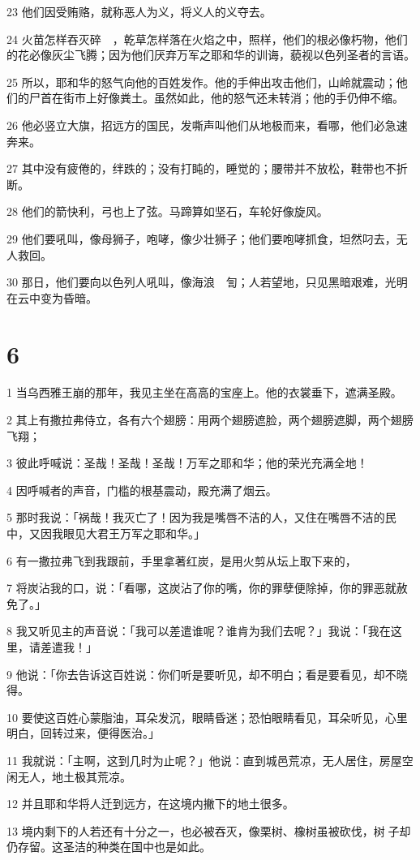 \par 23 他们因受贿赂，就称恶人为义，将义人的义夺去。
\par 24 火苗怎样吞灭碎　，乾草怎样落在火焰之中，照样，他们的根必像朽物，他们的花必像灰尘飞腾；因为他们厌弃万军之耶和华的训诲，藐视以色列圣者的言语。
\par 25 所以，耶和华的怒气向他的百姓发作。他的手伸出攻击他们，山岭就震动；他们的尸首在街市上好像粪土。虽然如此，他的怒气还未转消；他的手仍伸不缩。
\par 26 他必竖立大旗，招远方的国民，发嘶声叫他们从地极而来，看哪，他们必急速奔来。
\par 27 其中没有疲倦的，绊跌的；没有打盹的，睡觉的；腰带并不放松，鞋带也不折断。
\par 28 他们的箭快利，弓也上了弦。马蹄算如坚石，车轮好像旋风。
\par 29 他们要吼叫，像母狮子，咆哮，像少壮狮子；他们要咆哮抓食，坦然叼去，无人救回。
\par 30 那日，他们要向以色列人吼叫，像海浪　訇；人若望地，只见黑暗艰难，光明在云中变为昏暗。

\chapter{6}

\par 1 当乌西雅王崩的那年，我见主坐在高高的宝座上。他的衣裳垂下，遮满圣殿。
\par 2 其上有撒拉弗侍立，各有六个翅膀：用两个翅膀遮脸，两个翅膀遮脚，两个翅膀飞翔；
\par 3 彼此呼喊说：圣哉！圣哉！圣哉！万军之耶和华；他的荣光充满全地！
\par 4 因呼喊者的声音，门槛的根基震动，殿充满了烟云。
\par 5 那时我说：「祸哉！我灭亡了！因为我是嘴唇不洁的人，又住在嘴唇不洁的民中，又因我眼见大君王万军之耶和华。」
\par 6 有一撒拉弗飞到我跟前，手里拿著红炭，是用火剪从坛上取下来的，
\par 7 将炭沾我的口，说：「看哪，这炭沾了你的嘴，你的罪孽便除掉，你的罪恶就赦免了。」
\par 8 我又听见主的声音说：「我可以差遣谁呢？谁肯为我们去呢？」我说：「我在这里，请差遣我！」
\par 9 他说：「你去告诉这百姓说：你们听是要听见，却不明白；看是要看见，却不晓得。
\par 10 要使这百姓心蒙脂油，耳朵发沉，眼睛昏迷；恐怕眼睛看见，耳朵听见，心里明白，回转过来，便得医治。」
\par 11 我就说：「主啊，这到几时为止呢？」他说：直到城邑荒凉，无人居住，房屋空闲无人，地土极其荒凉。
\par 12 并且耶和华将人迁到远方，在这境内撇下的地土很多。
\par 13 境内剩下的人若还有十分之一，也必被吞灭，像栗树、橡树虽被砍伐，树子却仍存留。这圣洁的种类在国中也是如此。

